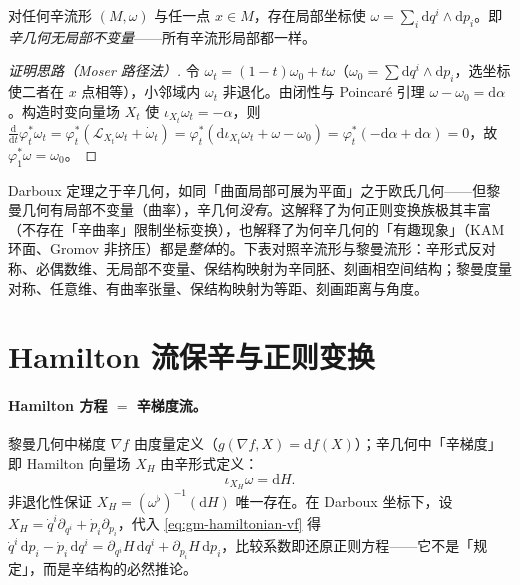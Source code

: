 \begin{theorem}[Darboux]\label{thm:gm-darboux}
对任何辛流形 $(M,\omega)$ 与任一点 $x\in M$，存在局部坐标使 $\omega=\sum_i\mathrm dq^i\wedge\mathrm dp_i$。即\emph{辛几何无局部不变量}——所有辛流形局部都一样。
\end{theorem}

\begin{proof}[证明思路（Moser 路径法）]
令 $\omega_t=(1-t)\omega_0+t\omega$（$\omega_0=\sum\mathrm dq^i\wedge\mathrm dp_i$，选坐标使二者在 $x$ 点相等），小邻域内 $\omega_t$ 非退化。由闭性与 Poincaré 引理 $\omega-\omega_0=\mathrm d\alpha$。构造时变向量场 $X_t$ 使 $\iota_{X_t}\omega_t=-\alpha$，则 $\tfrac{\mathrm d}{\mathrm dt}\varphi_t^*\omega_t=\varphi_t^*(\mathcal L_{X_t}\omega_t+\dot\omega_t)=\varphi_t^*(\mathrm d\iota_{X_t}\omega_t+\omega-\omega_0)=\varphi_t^*(-\mathrm d\alpha+\mathrm d\alpha)=0$，故 $\varphi_1^*\omega=\omega_0$。
\end{proof}

\begin{insight}
Darboux 定理之于辛几何，如同「曲面局部可展为平面」之于欧氏几何——但黎曼几何有局部不变量（曲率），辛几何\emph{没有}。这解释了为何正则变换族极其丰富（不存在「辛曲率」限制坐标变换），也解释了为何辛几何的「有趣现象」（KAM 环面、Gromov 非挤压）都是\emph{整体}的。下表对照辛流形与黎曼流形：辛形式反对称、必偶数维、无局部不变量、保结构映射为辛同胚、刻画相空间结构；黎曼度量对称、任意维、有曲率张量、保结构映射为等距、刻画距离与角度。
\end{insight}

\section{Hamilton 流保辛与正则变换}
\label{sec:gm-symplectic-flow}

\paragraph{Hamilton 方程 $=$ 辛梯度流。}
黎曼几何中梯度 $\nabla f$ 由度量定义（$g(\nabla f,X)=\mathrm df(X)$）；辛几何中「辛梯度」即 Hamilton 向量场 $X_H$ 由辛形式定义：
\begin{equation}
  \iota_{X_H}\omega=\mathrm dH.
  \label{eq:gm-hamiltonian-vf}
\end{equation}
非退化性保证 $X_H=(\omega^\flat)^{-1}(\mathrm dH)$ 唯一存在。在 Darboux 坐标下，设 $X_H=\dot q^i\partial_{q^i}+\dot p_i\partial_{p_i}$，代入 \cref{eq:gm-hamiltonian-vf} 得 $\dot q^i\,\mathrm dp_i-\dot p_i\,\mathrm dq^i=\partial_{q^i}H\,\mathrm dq^i+\partial_{p_i}H\,\mathrm dp_i$，比较系数即还原正则方程——它不是「规定」，而是辛结构的必然推论。


